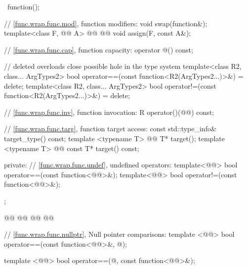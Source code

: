 \documentclass[american,twoside]{book}
\begin{document}
\begin{codeblock}
{{    ~function();

    // \ref{func.wrap.func.mod}, function modifiers:
    void swap(function&);
    template<class F, @@ A> 
      @@ 
            @@
      void assign(F, const A&);

    // \ref{func.wrap.func.cap}, function capacity:
    operator @\unspecbool@() const;

    // deleted overloads close possible hole in the type system
    template<class R2, class... ArgTypes2>
        bool operator==(const function<R2(ArgTypes2...)>&) = delete;
    template<class R2, class... ArgTypes2>
        bool operator!=(const function<R2(ArgTypes2...)>&) = delete;

    // \ref{func.wrap.func.inv}, function invocation:
    R operator()(@@) const;

    // \ref{func.wrap.func.targ}, function target access:
    const std::type_info& target_type() const;
    template <typename T> 
      @@
      T* target();
    template <typename T> 
      @@
      const T* target() const;

  private:
    // \ref{func.wrap.func.undef}, undefined operators:
    template<@@> bool operator==(const function<@@>&);
    template<@@> bool operator!=(const function<@@>&);
  };

@@
  @@ 
    @@
  @\addedConcepts{\}}@

  // \ref{func.wrap.func.nullptr}, Null pointer comparisons:
  template <@@>
    bool operator==(const function<@@>&, @\unspecnull@);

  template <@@>
    bool operator==(@\unspecnull@, const function<@@>&);

}
\end{codeblock}
\end{document}
